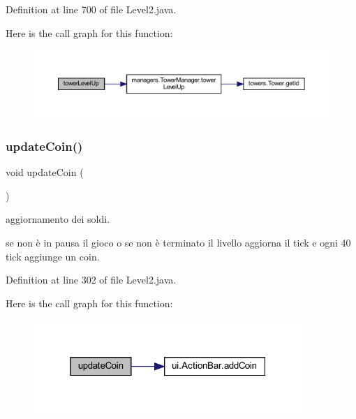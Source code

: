 Definition at line 700 of file Level2.\+java.

Here is the call graph for this function\+:\nopagebreak
\begin{figure}[H]
\begin{center}
\leavevmode
\includegraphics[width=350pt]{classscenes_1_1_level2_a8a3c715fcfd3d65e1d8241a1fa4965ff_cgraph}
\end{center}
\end{figure}
\mbox{\label{classscenes_1_1_level2_a7ca93fcd8c7440e7b3f64c595a5be28c}} 
\subsubsection{\texorpdfstring{update\+Coin()}{updateCoin()}}
{\footnotesize\ttfamily void update\+Coin (\begin{DoxyParamCaption}{ }\end{DoxyParamCaption})}



aggiornamento dei soldi. 

se non è in pausa il gioco o se non è terminato il livello aggiorna il tick e ogni 40 tick aggiunge un coin. 

Definition at line 302 of file Level2.\+java.

Here is the call graph for this function\+:\nopagebreak
\begin{figure}[H]
\begin{center}
\leavevmode
\includegraphics[width=289pt]{classscenes_1_1_level2_a7ca93fcd8c7440e7b3f64c595a5be28c_cgraph}
\end{center}
\end{figure}
\mbox{\label{classscenes_1_1_level2_af005ec68c869a6acd5e833cba9330a50}} 
